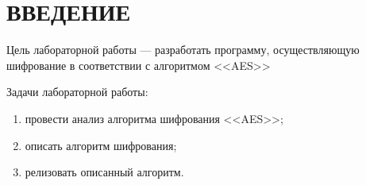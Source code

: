 \chapter*{ВВЕДЕНИЕ}

Цель лабораторной работы --- разработать программу, осуществляющую шифрование в соответствии с алгоритмом <<AES>>

Задачи лабораторной работы:

\begin{enumerate}
    \item провести анализ алгоритма шифрования <<AES>>;
    \item описать алгоритм шифрования;
    \item релизовать описанный алгоритм.
\end{enumerate}
